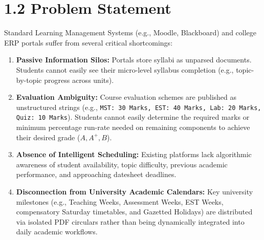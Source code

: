 \documentclass[12pt,a4paper]{report}
\begin{document}
\section{1.2 Problem Statement}
Standard Learning Management Systems (e.g., Moodle, Blackboard) and college ERP portals suffer from several critical shortcomings:
\begin{enumerate}
    \item \textbf{Passive Information Silos:} Portals store syllabi as unparsed documents. Students cannot easily see their micro-level syllabus completion (e.g., topic-by-topic progress across units).
    \item \textbf{Evaluation Ambiguity:} Course evaluation schemes are published as unstructured strings (e.g., \texttt{MST: 30 Marks, EST: 40 Marks, Lab: 20 Marks, Quiz: 10 Marks}). Students cannot easily determine the required marks or minimum percentage run-rate needed on remaining components to achieve their desired grade ($A, A^+, B$).
    \item \textbf{Absence of Intelligent Scheduling:} Existing platforms lack algorithmic awareness of student availability, topic difficulty, previous academic performance, and approaching datesheet deadlines.
    \item \textbf{Disconnection from University Academic Calendars:} Key university milestones (e.g., Teaching Weeks, Assessment Weeks, EST Weeks, compensatory Saturday timetables, and Gazetted Holidays) are distributed via isolated PDF circulars rather than being dynamically integrated into daily academic workflows.
\end{enumerate}
\end{document}
